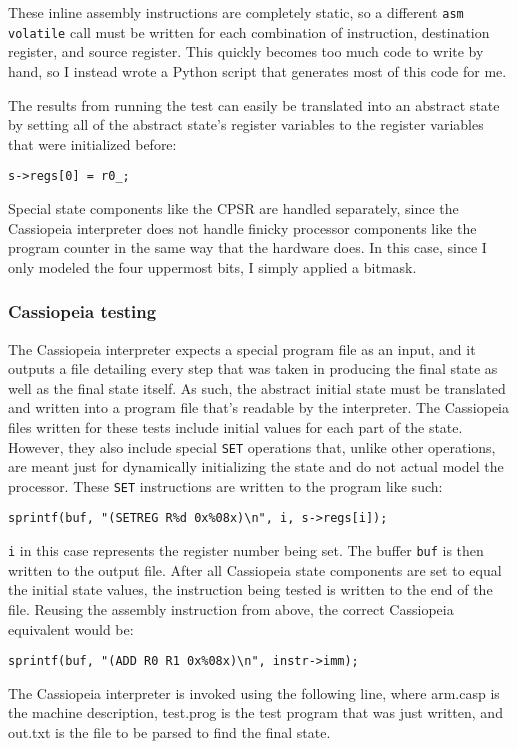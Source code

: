 \documentclass[letterpaper,12pt]{article}
\begin{document}
These inline assembly instructions are completely static, so a different \texttt{asm volatile} call must be written for each combination of instruction, destination register, and source register. This quickly becomes too much code to write by hand, so I instead wrote a Python script that generates most of this code for me.

The results from running the test can easily be translated into an abstract state by setting all of the abstract state's register variables to the register variables that were initialized before:

\texttt{s->regs[0] = r0\_;}

Special state components like the CPSR are handled separately, since the Cassiopeia interpreter does not handle finicky processor components like the program counter in the same way that the hardware does. In this case, since I only modeled the four uppermost bits, I simply applied a bitmask.

\subsubsection{Cassiopeia testing}

The Cassiopeia interpreter expects a special program file as an input, and it outputs a file detailing every step that was taken in producing the final state as well as the final state itself. As such, the abstract initial state must be translated and written into a program file that's readable by the interpreter. The Cassiopeia files written for these tests include initial values for each part of the state. However, they also include special \texttt{SET} operations that, unlike other operations, are meant just for dynamically initializing the state and do not actual model the processor. These \texttt{SET} instructions are written to the program like such:

\texttt{sprintf(buf, "(SETREG R\%d 0x\%08x)\textbackslash n", i, s->regs[i]);}

\texttt{i} in this case represents the register number being set. The buffer \texttt{buf} is then written to the output file. After all Cassiopeia state components are set to equal the initial state values, the instruction being tested is written to the end of the file. Reusing the assembly instruction from above, the correct Cassiopeia equivalent would be:

\texttt{sprintf(buf, "(ADD R0 R1 0x\%08x)\textbackslash n", instr->imm);}

The Cassiopeia interpreter is invoked using the following line, where arm.casp is the machine description, test.prog is the test program that was just written, and out.txt is the file to be parsed to find the final state.
\end{document}
